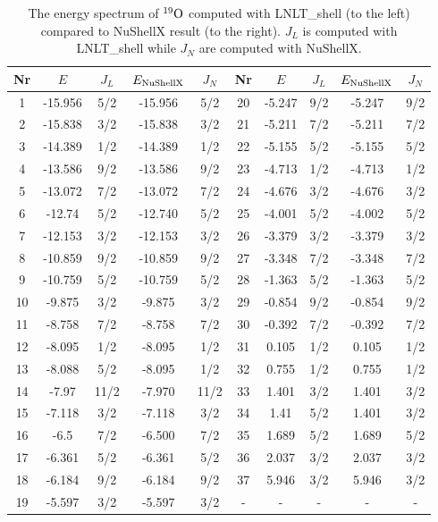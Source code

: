 \begin{table}[h]
\caption{The energy spectrum of $^{19}\rm{O}$ computed with LNLT\_shell (to the left) compared to NuShellX result (to the right). \(J_L\) is computed with LNLT\_shell while \(J_N\) are computed with NuShellX.}
\label{tab:ox19}
\begin{tabular}{c|cc|cc||c|cc|cc}
\hline Nr & \(E\) & \(J_{L}\) & \(E_{\rm{NuShellX}}\) & \(J_{N}\) & Nr & \(E\) & \(J_{L}\) & \(E_{\rm{NuShellX}}\) & \(J_{N}\) \\
\hline 1   & -15.956 &       5/2 & -15.956 & 5/2 & 20  &  -5.247 &       9/2 & -5.247 & 9/2 \\
 2   & -15.838 &       3/2 & -15.838 & 3/2 & 21  &  -5.211 &       7/2 & -5.211 & 7/2 \\
 3   & -14.389 &       1/2 & -14.389 & 1/2 & 22  &  -5.155 &       5/2 & -5.155 & 5/2 \\
 4   & -13.586 &       9/2 & -13.586 & 9/2 & 23  &  -4.713 &       1/2 & -4.713 & 1/2 \\
 5   & -13.072 &       7/2 & -13.072 & 7/2 & 24  &  -4.676 &       3/2 & -4.676 & 3/2 \\
 6   &  -12.74 &       5/2 & -12.740 & 5/2 & 25  &  -4.001 &       5/2 & -4.002 & 5/2 \\
 7   & -12.153 &       3/2 & -12.153 & 3/2 & 26  &  -3.379 &       3/2 & -3.379 & 3/2 \\
 8   & -10.859 &       9/2 & -10.859 & 9/2 & 27  &  -3.348 &       7/2 & -3.348 & 7/2 \\
 9   & -10.759 &       5/2 & -10.759 & 5/2 & 28  &  -1.363 &       5/2 & -1.363 & 5/2 \\
 10  &  -9.875 &       3/2 & -9.875 & 3/2 & 29  &  -0.854 &       9/2 & -0.854 & 9/2 \\
 11  &  -8.758 &       7/2 & -8.758 & 7/2 & 30  &  -0.392 &       7/2 & -0.392 & 7/2 \\
 12  &  -8.095 &       1/2 & -8.095 & 1/2 & 31  &   0.105 &       1/2 & 0.105 & 1/2 \\
 13  &  -8.088 &       5/2 & -8.095 & 1/2 & 32  &   0.755 &       1/2 & 0.755 & 1/2 \\
 14  &   -7.97 &      11/2 & -7.970 & 11/2 & 33  &   1.401 &       3/2 & 1.401 & 3/2 \\
 15  &  -7.118 &       3/2 & -7.118 & 3/2 & 34  &    1.41 &       5/2 & 1.401 & 3/2 \\
 16  &    -6.5 &       7/2 & -6.500 & 7/2 & 35  &   1.689 &       5/2 & 1.689 & 5/2 \\
 17  &  -6.361 &       5/2 & -6.361 & 5/2 & 36  &   2.037 &       3/2 & 2.037 & 3/2 \\
 18  &  -6.184 &       9/2 & -6.184 & 9/2 & 37  &   5.946 &       3/2 & 5.946 & 3/2 \\
 19  &  -5.597 &       3/2 & -5.597 & 3/2 &  -  &  -  &  -  &  -  &  -  \\
\hline
\end{tabular}
\end{table}

